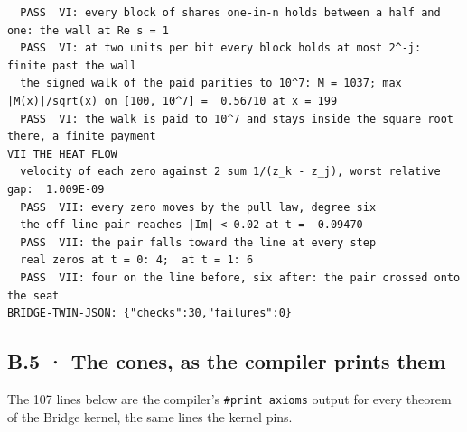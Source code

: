 \documentclass[10pt,twocolumn]{article}
\begin{document}
\begin{Verbatim}
  PASS  VI: every block of shares one-in-n holds between a half and one: the wall at Re s = 1
  PASS  VI: at two units per bit every block holds at most 2^-j: finite past the wall
  the signed walk of the paid parities to 10^7: M = 1037; max |M(x)|/sqrt(x) on [100, 10^7] =  0.56710 at x = 199
  PASS  VI: the walk is paid to 10^7 and stays inside the square root there, a finite payment
VII THE HEAT FLOW
  velocity of each zero against 2 sum 1/(z_k - z_j), worst relative gap:  1.009E-09
  PASS  VII: every zero moves by the pull law, degree six
  the off-line pair reaches |Im| < 0.02 at t =  0.09470
  PASS  VII: the pair falls toward the line at every step
  real zeros at t = 0: 4;  at t = 1: 6
  PASS  VII: four on the line before, six after: the pair crossed onto the seat
BRIDGE-TWIN-JSON: {"checks":30,"failures":0}
\end{Verbatim}

\hypertarget{b.5-the-cones-as-the-compiler-prints-them}{%
\subsection{B.5 · The cones, as the compiler prints
them}\label{b.5-the-cones-as-the-compiler-prints-them}}

The 107 lines below are the compiler's \texttt{\#print\ axioms} output
for every theorem of the Bridge kernel, the same lines the kernel pins.
\end{document}
